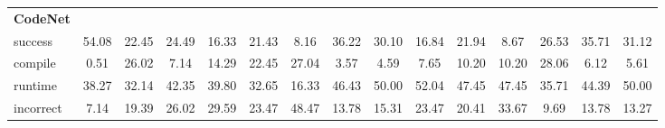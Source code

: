 \begin{table}[t]
\begin{tabular}{@{}lcccccccccccccc@{}}
\textbf{CodeNet} & & & & & & & & & & & & & & \\ 
\quad success & 54.08 & 22.45 & 24.49 & 16.33 & 21.43 & 8.16 & 36.22 & 30.10 & 16.84 & 21.94 & 8.67 & 26.53 & 35.71 & 31.12 \\
\qquad compile & 0.51 & 26.02 & 7.14 & 14.29 & 22.45 & 27.04 & 3.57 & 4.59 & 7.65 & 10.20 & 10.20 & 28.06 & 6.12 & 5.61 \\
\qquad runtime & 38.27 & 32.14 & 42.35 & 39.80 & 32.65 & 16.33 & 46.43 & 50.00 & 52.04 & 47.45 & 47.45 & 35.71 & 44.39 & 50.00 \\
\qquad incorrect & 7.14 & 19.39 & 26.02 & 29.59 & 23.47 & 48.47 & 13.78 & 15.31 & 23.47 & 20.41 & 33.67 & 9.69 & 13.78 & 13.27 \\
 

\bottomrule
\end{tabular}
\end{table}




